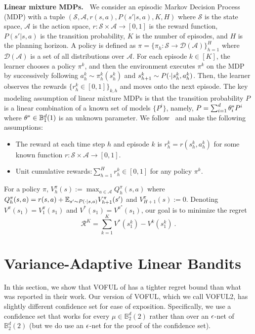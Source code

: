 \documentclass{article}
\begin{document}
\textbf{Linear mixture MDPs.~}
We consider an episodic Markov Decision Process (MDP) with a tuple $(\mathcal{S},\mathcal{A},r(s,a),P(s'|s,a),K,H)$ where $\mathcal{S}$ is the state space, $\mathcal{A}$ is the action space, $r:\mathcal{S}\times \mathcal{A} \rightarrow [0,1]$ is the reward function, $P(s'|s,a)$ is the transition probability, $K$ is the number of episodes, and $H$ is the planning horizon.
A policy is defined as $\pi = \{\pi_h:\mathcal{S}\rightarrow \mathcal{D}(\mathcal{A})\}_{h=1}^H$ where $\mathcal{D}(\mathcal{A})$ is a set of all distributions over $\mathcal{A}$.
For each episode $k\in[K]$, the learner chooses a policy $\pi^k$, and then the environment executes $\pi^k$ on the MDP by successively following $a_h^k \sim \pi_h^k(s_h^k)$ and $s_{h+1}^k \sim P(\cdot|s_h^k,a_h^k)$.
Then, the learner observes the rewards $\{r_h^k \in [0,1]\}_{k,h}$ and moves onto the next episode.
The key modeling assumption of linear mixture MDPs is that the transition probability $P$ is a linear combination of a known set of models $\{P^i\}$, namely, $P=\sum_{i=1}^d {\theta}_i^* P^i$
where ${\theta}^* \in \mathbb{B}_1^d(1)$ is an unknown parameter.
We follow~\cite{zhang21variance} and make the following assumptions: 
\begin{itemize}
    \item The reward at each time step $h$ and episode $k$ is $r_h^k = r(s_h^k,a_h^k)$ for some known function $r:\mathcal{S}\times\mathcal{A} \rightarrow [0,1]$. 
    \item Unit cumulative rewards:$\sum_{h=1}^H r_h^k \in [0,1]$ for any policy $\pi^k$.
\end{itemize}
For a policy $\pi$, $V_h^\pi(s):=\max_{a\in \mathcal{A}} Q_h^\pi(s,a)$ where $Q_h^\pi(s,a)=r(s,a)+\mathbb{E}_{s'\sim P(\cdot|s,a)}V_{h+1}^\pi(s')$ and $V_{H+1}^\pi(s) := 0$. Denoting $V^\pi(s_1)=V_1^\pi(s_1)$ and $V^*(s_1)=V^{\pi^*}(s_1)$, our goal is to minimize the regret 
\begin{equation*}
    \mathcal{R}^K =\sum_{k=1}^K V^*(s_1^k)-V^k(s_1^k) ~.
\end{equation*}

\section{Variance-Adaptive Linear Bandits}
\label{sec:lb}

In this section, we show that VOFUL of \citet{zhang21variance} has a tighter regret bound than what was reported in their work.
Our version of VOFUL, which we call VOFUL2, has slightly different confidence set for ease of exposition.
Specifically, we use a confidence set that works for every $\mu \in \mathbb{B}^d_2(2)$ rather than over an $\epsilon$-net of $\mathbb{B}^d_2(2)$ (but we do use an $\epsilon$-net for the proof of the confidence set).
\end{document}
